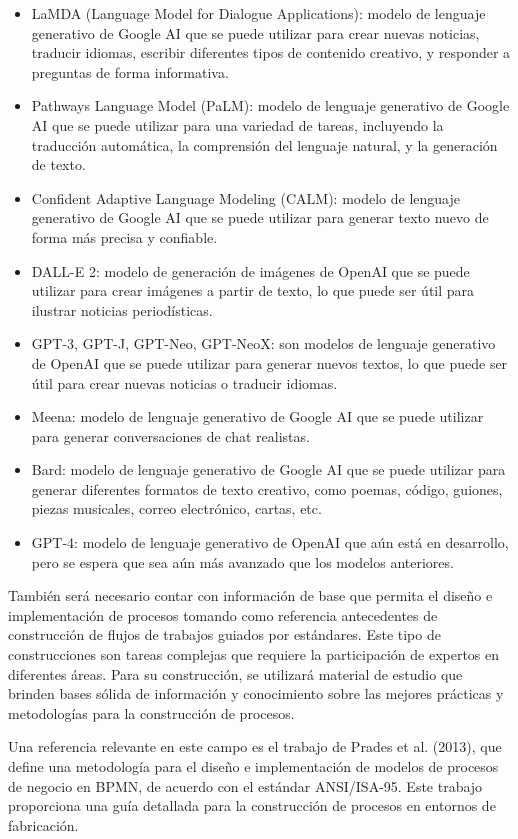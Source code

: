 \documentclass[12pt]{article}
\begin{document}
\begin{itemize}
    \item LaMDA (Language Model for Dialogue Applications): modelo de lenguaje generativo de Google AI que se puede utilizar para crear nuevas noticias, traducir idiomas, escribir diferentes tipos de contenido creativo, y responder a preguntas de forma informativa.
    \item Pathways Language Model (PaLM): modelo de lenguaje generativo de Google AI que se puede utilizar para una variedad de tareas, incluyendo la traducción automática, la comprensión del lenguaje natural, y la generación de texto.
    \item Confident Adaptive Language Modeling (CALM): modelo de lenguaje generativo de Google AI que se puede utilizar para generar texto nuevo de forma más precisa y confiable.
    \item DALL-E 2: modelo de generación de imágenes de OpenAI que se puede utilizar para crear imágenes a partir de texto, lo que puede ser útil para ilustrar noticias periodísticas.
    \item GPT-3, GPT-J, GPT-Neo, GPT-NeoX: son modelos de lenguaje generativo de OpenAI que se puede utilizar para generar nuevos textos, lo que puede ser útil para crear nuevas noticias o traducir idiomas.
    \item Meena: modelo de lenguaje generativo de Google AI que se puede utilizar para generar conversaciones de chat realistas.
    \item Bard: modelo de lenguaje generativo de Google AI que se puede utilizar para generar diferentes formatos de texto creativo, como poemas, código, guiones, piezas musicales, correo electrónico, cartas, etc.
    \item GPT-4: modelo de lenguaje generativo de OpenAI que aún está en desarrollo, pero se espera que sea aún más avanzado que los modelos anteriores. 
\end{itemize}

También será necesario contar con información de base que permita el diseño e implementación de procesos tomando como referencia antecedentes de construcción de flujos de trabajos guiados por estándares. Este tipo de construcciones son tareas complejas que requiere la participación de expertos en diferentes áreas. 
Para su construcción, se utilizará material de estudio que brinden bases sólida de información y conocimiento sobre las mejores prácticas y metodologías para la construcción de procesos.

Una referencia relevante en este campo es el trabajo de Prades et al. (2013), que define una metodología para el diseño e implementación de modelos de procesos de negocio en BPMN, de acuerdo con el estándar ANSI/ISA-95. Este trabajo proporciona una guía detallada para la construcción de procesos en entornos de fabricación.
\end{document}
